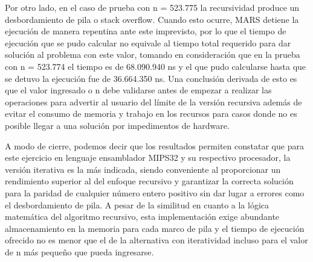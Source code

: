 \documentclass[12pt, letterpaper]{article}
\begin{document}
Por otro lado, en el caso de prueba con n = 523.775 la recursividad produce un desbordamiento de pila o stack overflow. Cuando esto ocurre, MARS detiene la ejecución de manera repentina ante este imprevisto, por lo que el tiempo de ejecución que se pudo calcular no equivale al tiempo total requerido para dar solución al problema con este valor, tomando en consideración que en la prueba con n = 523.774 el tiempo es de 68.090.940 ns y el que pudo calcularse hasta que se detuvo la ejecución fue de 36.664.350 ns. Una conclusión derivada de esto es que el valor ingresado o n debe validarse antes de empezar a realizar las operaciones para advertir al usuario del límite de la versión recursiva además de evitar el consumo de memoria y trabajo en los recursos para casos donde no es posible llegar a una solución por impedimentos de hardware. 

A modo de cierre, podemos decir que los resultados permiten constatar que para este ejercicio en lenguaje ensamblador MIPS32 y su respectivo procesador, la versión iterativa es la más indicada, siendo conveniente al proporcionar un rendimiento superior al del enfoque recursivo y garantizar la correcta solución para la paridad de cualquier número entero positivo sin dar lugar a errores como el desbordamiento de pila. A pesar de la similitud en cuanto a la lógica matemática del algoritmo recursivo, esta implementación exige abundante almacenamiento en la memoria para cada marco de pila y el tiempo de ejecución ofrecido no es menor que el de la alternativa con iteratividad incluso para el valor de n más pequeño que pueda ingresarse. 
\end{document}
